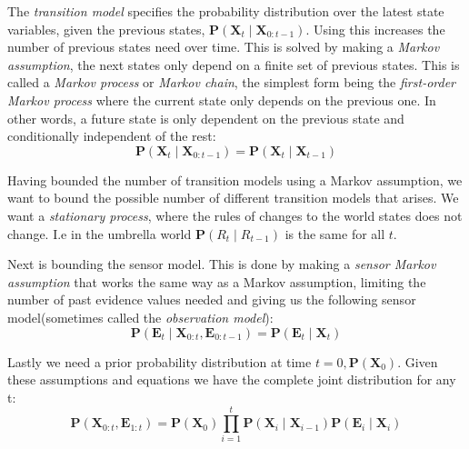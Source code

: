 \documentclass[11pt, letterpaper]{report}
\numberwithin{equation}{section}
\begin{document}
The \emph{transition model} specifies the probability distribution over the
latest state variables, given the previous states,
$\boldsymbol{P}(\boldsymbol{X}_t \mid \boldsymbol{X}_{0:t-1})$. Using this
increases the number of previous states need over time. This is solved by making
a \emph{Markov assumption}, the next states only depend on a finite set of
previous states. This is called a \emph{Markov process} or \emph{Markov chain},
the simplest form being the \emph{first-order Markov process} where the current
state only depends on the previous one. In other words, a future state is
only dependent on the previous state and conditionally independent of the rest:
\begin{equation}
  \label{eq:first-order markov}
  \boldsymbol{P}(\boldsymbol{X}_t \mid \boldsymbol{X}_{0:t-1}) = \boldsymbol{P}(\boldsymbol{X}_t \mid \boldsymbol{X}_{t-1})
\end{equation}

Having bounded the number of transition models using a Markov assumption, we
want to bound the possible number of different transition models that arises. We
want a \emph{stationary process}, where the rules of changes to the world states
does not change. I.e in the umbrella world $\boldsymbol{P}(R_t \mid R_{t-1})$ is
the same for all $t$.

Next is bounding the sensor model. This is done by making a \emph{sensor Markov
  assumption} that works the same way as a Markov assumption, limiting the
number of past evidence values needed and giving us the following sensor
model(sometimes called the \emph{observation model}):
\begin{equation}
  \label{eq:sensor markov}
  \boldsymbol{P}(\boldsymbol{E}_t \mid \boldsymbol{X}_{0:t}, \boldsymbol{E}_{0:t-1})
  = \boldsymbol{P}(\boldsymbol{E}_t \mid \boldsymbol{X}_{t})
\end{equation}

Lastly we need a prior probability distribution at time $t = 0,
\boldsymbol{P}(\boldsymbol{X}_0)$. Given these assumptions and equations we have
the complete joint distribution for any t:
\begin{equation}
  \label{eq:complete joint dist}
  \boldsymbol{P}(\boldsymbol{X}_{0:t}, \boldsymbol{E}_{1:t}) =
  \boldsymbol{P}(\boldsymbol{X}_0) \prod_{i=1}^t\boldsymbol{P}(\boldsymbol{X}_i \mid \boldsymbol{X}_{i-1})\boldsymbol{P}(\boldsymbol{E}_i \mid \boldsymbol{X}_{i})
\end{equation}
\end{document}
